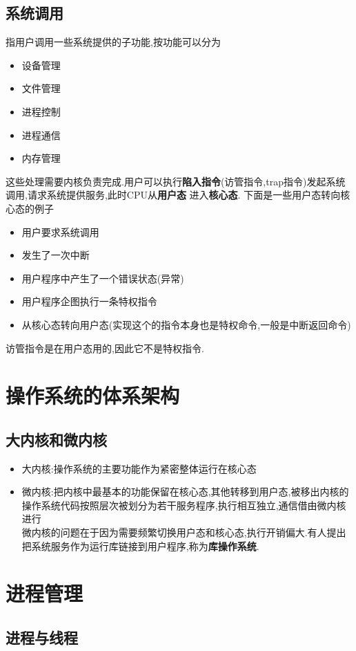 \documentclass{ctexart}
\begin{document}
\subsection{系统调用}
指用户调用一些系统提供的子功能,按功能可以分为
\begin{itemize}
	\item 设备管理
	\item 文件管理
	\item 进程控制
	\item 进程通信
	\item 内存管理
\end{itemize}
这些处理需要内核负责完成.用户可以执行\textbf{陷入指令}(访管指令,trap指令)发起系统调用,请求系统提供服务,此时CPU从\textbf{用户态}
进入\textbf{核心态}.
下面是一些用户态转向核心态的例子
\begin{itemize}
	\item 用户要求系统调用
	\item 发生了一次中断
	\item 用户程序中产生了一个错误状态(异常)
	\item 用户程序企图执行一条特权指令
	\item 从核心态转向用户态(实现这个的指令本身也是特权命令,一般是中断返回命令)
\end{itemize}
访管指令是在用户态用的,因此它不是特权指令.
\section{操作系统的体系架构}
\subsection{大内核和微内核}
\begin{itemize}
	\item 大内核:操作系统的主要功能作为紧密整体运行在核心态
	\item 微内核:把内核中最基本的功能保留在核心态,其他转移到用户态,被移出内核的操作系统代码按照层次被划分为若干服务程序,执行相互独立,通信借由微内核进行\\
	      微内核的问题在于因为需要频繁切换用户态和核心态,执行开销偏大.有人提出把系统服务作为运行库链接到用户程序,称为\textbf{库操作系统}.
\end{itemize}

\section{进程管理}
\subsection{进程与线程}
\end{document}
